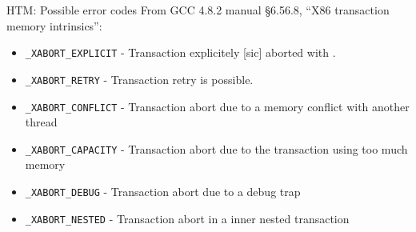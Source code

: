 \documentclass[xcolor=dvipsnames]{beamer}
\begin{document}
\begin{frame}{HTM: Possible \xabort error codes}
	From GCC 4.8.2 manual \S 6.56.8, ``X86 transaction memory intrinsics'':
	\begin{itemize}
		\item {\tt \_XABORT\_EXPLICIT} - Transaction explicitely [sic] aborted with \xabort.
		\item {\tt \_XABORT\_RETRY} - Transaction retry is possible.
		\item {\tt \_XABORT\_CONFLICT} - Transaction abort due to a memory conflict with another thread
		\item {\tt \_XABORT\_CAPACITY} - Transaction abort due to the transaction using too much memory
		\item {\tt \_XABORT\_DEBUG} - Transaction abort due to a debug trap
		\item {\tt \_XABORT\_NESTED} - Transaction abort in a inner nested transaction 
	\end{itemize}
\end{frame}
\end{document}
